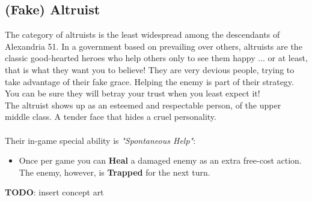 \subsection{(Fake) Altruist}
The category of altruists is the least widespread among the descendants of Alexandria 51. In a government based on prevailing over others, altruists are the classic good-hearted heroes who help others only to see them happy ... or at least, that is what they want you to believe! They are very devious people,
trying to take advantage of their fake grace. Helping the enemy is part of their strategy. You can be sure they will betray your trust when you least expect it!\\
The altruist shows up as an esteemed and respectable person, of the upper middle class. A tender face that hides a cruel personality.\\\\
Their in-game special ability is  \textit{"Spontaneous Help"}:
\begin{itemize}
\item Once per game you can \textbf{Heal} a damaged enemy as an extra free-cost action. The enemy, however, is \textbf{Trapped} for the next turn.
\end{itemize}
\textbf{TODO}: insert concept art